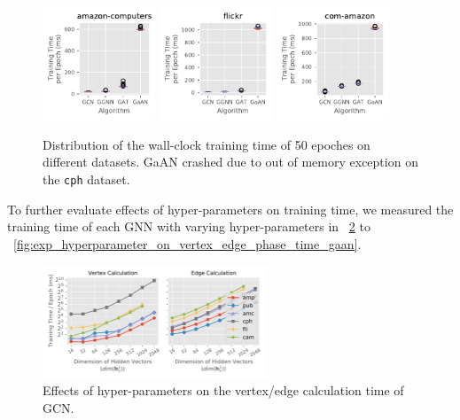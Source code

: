 \begin{figure}[htb]
    \includegraphics[width=0.3\textwidth]{figs/experiments/exp_absolute_training_time_comparison_amazon-computers.pdf}
    \includegraphics[width=0.3\textwidth]{figs/experiments/exp_absolute_training_time_comparison_flickr.pdf}
    \includegraphics[width=0.3\textwidth]{figs/experiments/exp_absolute_training_time_comparison_com-amazon.pdf}
    \caption{Distribution of the wall-clock training time of 50 epoches on different datasets. GaAN crashed due to out of memory exception on the \texttt{cph} dataset.}
    \label{fig:exp_absolute_training_time}
\end{figure}

To further evaluate effects of hyper-parameters on training time, we measured the training time of each GNN with varying hyper-parameters in \figurename~\ref{fig:exp_hyperparameter_on_vertex_edge_phase_time_gcn} to \figurename~\ref{fig:exp_hyperparameter_on_vertex_edge_phase_time_gaan}.

\begin{figure}[H]
    \centering
    \includegraphics[width=0.6\textwidth]{figs/experiments/exp_hyperparameter_on_vertex_edge_phase_time_gcn.pdf}
    \caption{Effects of hyper-parameters on the vertex/edge calculation time of GCN.}
    \label{fig:exp_hyperparameter_on_vertex_edge_phase_time_gcn}
\end{figure}

